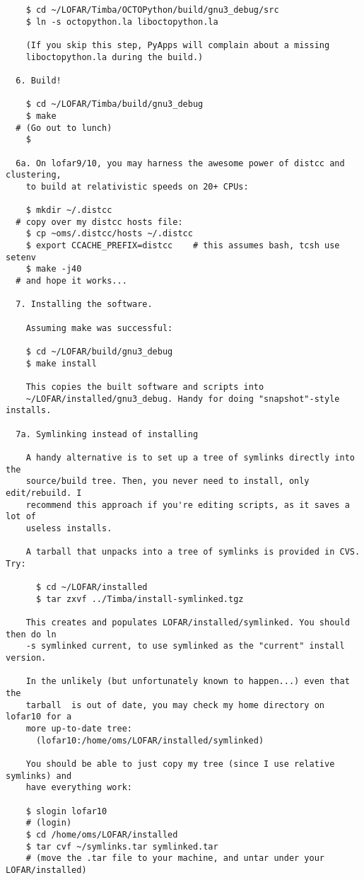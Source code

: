 \documentclass[10pt]{article}
\begin{document}
\begin{verbatim}
    $ cd ~/LOFAR/Timba/OCTOPython/build/gnu3_debug/src
    $ ln -s octopython.la liboctopython.la

    (If you skip this step, PyApps will complain about a missing 
    liboctopython.la during the build.)

  6. Build!

    $ cd ~/LOFAR/Timba/build/gnu3_debug
    $ make 
  # (Go out to lunch)
    $

  6a. On lofar9/10, you may harness the awesome power of distcc and clustering, 
    to build at relativistic speeds on 20+ CPUs:

    $ mkdir ~/.distcc
  # copy over my distcc hosts file:
    $ cp ~oms/.distcc/hosts ~/.distcc
    $ export CCACHE_PREFIX=distcc    # this assumes bash, tcsh use setenv
    $ make -j40 
  # and hope it works...

  7. Installing the software.

    Assuming make was successful:

    $ cd ~/LOFAR/build/gnu3_debug
    $ make install

    This copies the built software and scripts into
    ~/LOFAR/installed/gnu3_debug. Handy for doing "snapshot"-style installs. 

  7a. Symlinking instead of installing

    A handy alternative is to set up a tree of symlinks directly into the
    source/build tree. Then, you never need to install, only edit/rebuild. I 
    recommend this approach if you're editing scripts, as it saves a lot of
    useless installs. 
    
    A tarball that unpacks into a tree of symlinks is provided in CVS. Try:

      $ cd ~/LOFAR/installed
      $ tar zxvf ../Timba/install-symlinked.tgz
    
    This creates and populates LOFAR/installed/symlinked. You should then do ln
    -s symlinked current, to use symlinked as the "current" install version.

    In the unlikely (but unfortunately known to happen...) even that the
    tarball  is out of date, you may check my home directory on lofar10 for a
    more up-to-date tree:
      (lofar10:/home/oms/LOFAR/installed/symlinked)

    You should be able to just copy my tree (since I use relative symlinks) and
    have everything work:

    $ slogin lofar10
    # (login)
    $ cd /home/oms/LOFAR/installed
    $ tar cvf ~/symlinks.tar symlinked.tar
    # (move the .tar file to your machine, and untar under your LOFAR/installed)


\end{verbatim}
\end{document}
